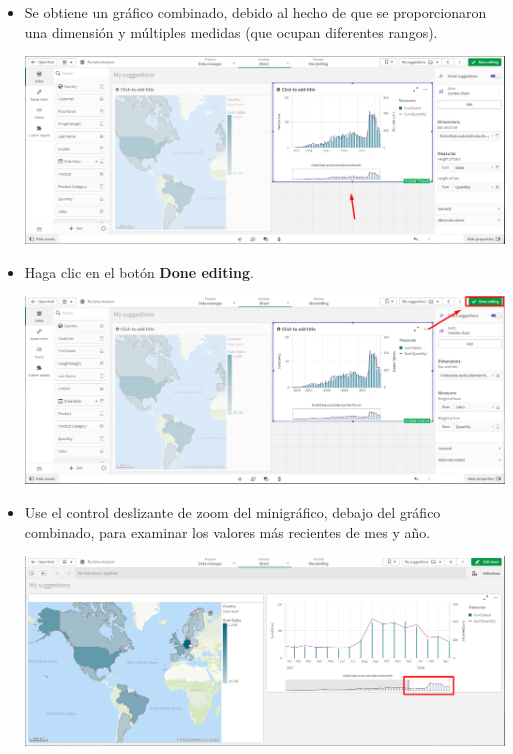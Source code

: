 \documentclass[12pt,letterpaper]{article}
\newcommand\tab[1][1cm]{\hspace*{#1}}
\begin{document}
\begin{enumerate}[\tab 1.]
\begin{center}
        \end{center}
        \begin{itemize}
            \item 
            Se obtiene un gráfico combinado, debido al hecho de que se proporcionaron una dimensión y múltiples medidas (que ocupan diferentes rangos).
            \begin{center}
                \includegraphics[width=13cm]{./img/img22.1.png}
            \end{center}
            \item Haga clic en el botón \textbf{Done editing}.
            \begin{center}
                \includegraphics[width=13cm]{./img/img22.2.png}
            \end{center}
            \item Use el control deslizante de zoom del minigráfico, debajo del gráfico combinado, para examinar los valores más recientes de mes y año.
            \begin{center}
                \includegraphics[width=13cm]{./img/img22.3.png}
            \end{center}
        \end{itemize}
    \end{enumerate}
    
\end{document}
